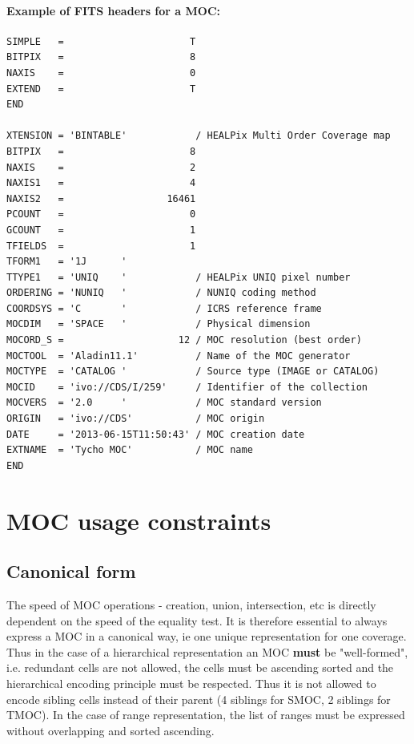 \documentclass[11pt,a4paper]{ivoa}
\begin{document}

 
\paragraph{Example of FITS headers for a MOC:}
\par\noindent
\begin{lstlisting}[basicstyle=\footnotesize\ttfamily]
SIMPLE   =                      T
BITPIX   =                      8
NAXIS    =                      0
EXTEND   =                      T
END
    
XTENSION = 'BINTABLE'            / HEALPix Multi Order Coverage map
BITPIX   =                      8
NAXIS    =                      2
NAXIS1   =                      4
NAXIS2   =                  16461
PCOUNT   =                      0
GCOUNT   =                      1
TFIELDS  =                      1
TFORM1   = '1J      '
TTYPE1   = 'UNIQ    '            / HEALPix UNIQ pixel number
ORDERING = 'NUNIQ   '            / NUNIQ coding method
COORDSYS = 'C       '            / ICRS reference frame
MOCDIM   = 'SPACE   '            / Physical dimension
MOCORD_S =                    12 / MOC resolution (best order)
MOCTOOL  = 'Aladin11.1'          / Name of the MOC generator
MOCTYPE  = 'CATALOG '            / Source type (IMAGE or CATALOG)
MOCID    = 'ivo://CDS/I/259'     / Identifier of the collection
MOCVERS  = '2.0     '            / MOC standard version
ORIGIN   = 'ivo://CDS'           / MOC origin
DATE     = '2013-06-15T11:50:43' / MOC creation date
EXTNAME  = 'Tycho MOC'           / MOC name
END
\end{lstlisting}

\section{MOC usage constraints}

\subsection{Canonical form}
\label{sec:can}
The speed of MOC operations - creation, union, intersection, etc
is directly dependent on the speed of the equality test. It is
therefore essential to always express a MOC in a canonical way, ie
one unique representation for one coverage. Thus in the case of a
hierarchical representation an MOC \textbf{must} be "well-formed", i.e. 
redundant cells are not allowed, the cells must be ascending sorted
and the hierarchical encoding principle must be respected. Thus it
is not allowed to encode sibling cells instead of their parent (4
siblings for SMOC, 2 siblings for TMOC). In the case of range
representation, the list of ranges must be expressed without
overlapping and sorted ascending.
\end{document}
